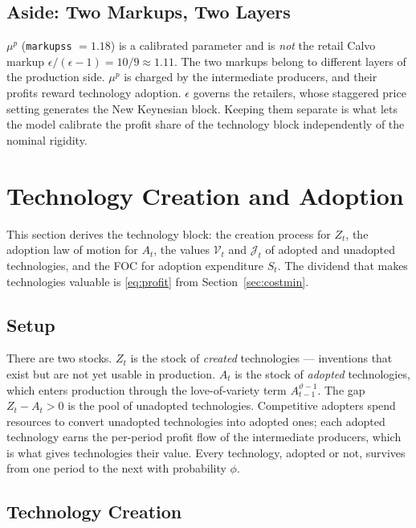 \documentclass[11pt]{article}
\begin{document}
\subsection{Aside: Two Markups, Two Layers}

$\mu^{p}$ (\texttt{markupss} $=1.18$) is a calibrated parameter and is \emph{not}
the retail Calvo markup $\epsilon/(\epsilon-1) = 10/9 \approx 1.11$. The two
markups belong to different layers of the production side. $\mu^{p}$ is charged by
the intermediate producers, and their profits reward technology adoption.
$\epsilon$ governs the retailers, whose staggered price setting generates the New
Keynesian block. Keeping them separate is what lets the model calibrate the profit
share of the technology block independently of the nominal rigidity.

\section{Technology Creation and Adoption}\label{sec:tech}

This section derives the technology block: the creation process for $Z_t$, the
adoption law of motion for $A_t$, the values $\mathcal{V}_t$ and $\mathcal{J}_t$
of adopted and unadopted technologies, and the FOC for adoption expenditure
$S_t$. The dividend that makes technologies valuable is \eqref{eq:profit} from
Section~\ref{sec:costmin}.

\subsection{Setup}

There are two stocks. $Z_t$ is the stock of \emph{created} technologies ---
inventions that exist but are not yet usable in production. $A_t$ is the stock of
\emph{adopted} technologies, which enters production through the love-of-variety
term $A_{t-1}^{\vartheta-1}$. The gap $Z_t - A_t > 0$ is the pool of unadopted
technologies. Competitive adopters spend resources to convert unadopted
technologies into adopted ones; each adopted technology earns the per-period
profit flow of the intermediate producers, which is what gives technologies their
value. Every technology, adopted or not, survives from one period to the next
with probability $\phi$.

\subsection{Technology Creation}
\end{document}
